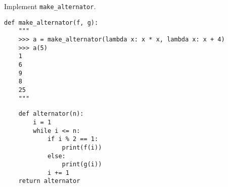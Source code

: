 \begin{blocksection}
\question Implement \lstinline$make_alternator$.

\begin{lstlisting}
def make_alternator(f, g):
    """
    >>> a = make_alternator(lambda x: x * x, lambda x: x + 4)
    >>> a(5)
    1
    6
    9
    8
    25
    """
\end{lstlisting}

\begin{solution}[1.5in]
\begin{lstlisting}
    def alternator(n):
        i = 1
        while i <= n:
            if i % 2 == 1:
                print(f(i))
            else:
                print(g(i))
            i += 1
    return alternator
\end{lstlisting}
\end{solution}
\end{blocksection}
